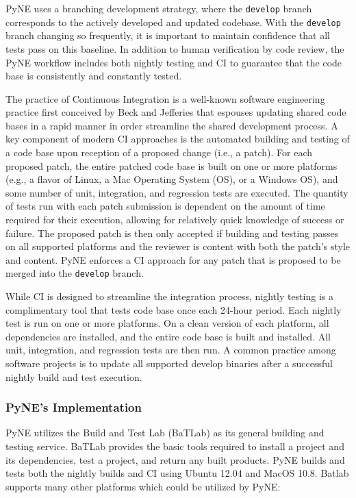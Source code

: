 \documentclass{anstrans}
\begin{document}
PyNE uses a branching
development strategy, where the \texttt{develop} branch corresponds to the
actively developed and updated codebase.
With the \texttt{develop} branch changing so frequently, it is important to maintain confidence that all tests pass on this baseline.
In addition to human verification by code review, the PyNE
workflow includes both nightly testing and CI to
guarantee that the code base is consistently and constantly tested.

The practice of Continuous Integration is a well-known software engineering
practice first conceived by Beck and Jefferies \cite{beck1998extreme} that
espouses updating shared code bases in a rapid manner in order streamline the
shared development process. A key component of modern CI approaches is the
automated building and testing of a code base upon reception of a proposed
change (i.e., a patch). For each proposed patch, the entire patched code base is
built on one or more platforms (e.g., a flavor of Linux, a Mac Operating System
(OS), or a Windows OS), and some number of unit, integration, and regression
tests are executed. The quantity of tests run with each patch submission is
dependent on the amount of time required for their execution, allowing for
relatively quick knowledge of success or failure. The proposed patch is then only
accepted if building and testing passes on all supported platforms and the
reviewer is content with both the patch's style and content. PyNE enforces a CI
approach for any patch that is proposed to be merged into the \texttt{develop}
branch.

While CI is designed to streamline the integration process, nightly testing is a
complimentary tool that tests code base once each 24-hour
period. Each nightly test is run on one or more platforms. On a clean version of
each platform, all dependencies are installed, and the entire code base is built
and installed. All unit, integration, and regression tests are then run. A
common practice among software projects is to update all supported develop
binaries after a successful nightly build and test execution.

\subsubsection{PyNE's Implementation}

PyNE utilizes the Build and Test Lab (BaTLab) \cite{batlab_2014} as its general
building and testing service. BaTLab provides the basic tools required to
install a project and its dependencies, test a project, and return any built
products. PyNE builds and tests both the nightly builds and CI using
Ubuntu 12.04 and MacOS 10.8. Batlab supports many other platforms which could be utilized by PyNE:
\end{document}

